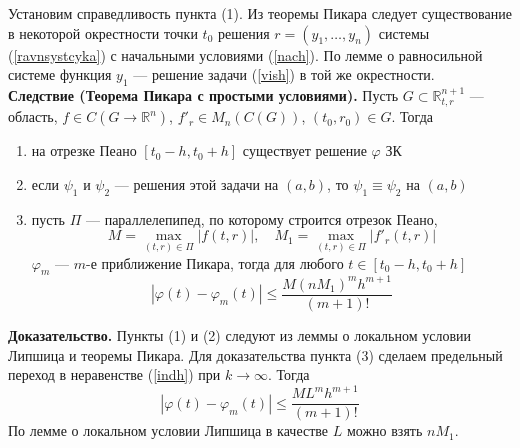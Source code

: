 Установим справедливость пункта (1). Из теоремы Пикара следует существование в некоторой окрестности точки $t_0$ решения $r = (y_1, \ldots, y_n)$ системы (\ref{ravnsystcyka}) с начальными условиями (\ref{nach}). По лемме о равносильной системе функция $y_1$ --- решение задачи (\ref{vish}) в той же окрестности.\\

\noindent \textbf{Следствие (Теорема Пикара с простыми условиями).} Пусть $G \subset \mathbb{R}_{t,r}^{n+1}$ --- область, $f \in C(G \to \mathbb{R}^n)$, $f'_r \in M_n(C(G))$, $(t_0, r_0) \in G$. Тогда
\begin{enumerate}
    \item на отрезке Пеано $[t_0 - h, t_0 + h]$ существует решение $\varphi$ ЗК
    \item если $\psi_1$ и $\psi_2$ --- решения этой задачи на $(a,b)$, то $\psi_1 \equiv \psi_2$ на $(a,b)$
    \item пусть $\Pi$ --- параллелепипед, по которому строится отрезок Пеано,
    \begin{equation*}
        M = \max_{(t,r) \in \Pi} |f(t,r)|, \quad M_1 = \max_{(t,r) \in \Pi} |f'_r(t,r)|
    \end{equation*}
    $\varphi_m$ --- $m$-е приближение Пикара, тогда для любого $t \in [t_0 - h, t_0 + h]$
    \begin{equation*}
        |\varphi(t) - \varphi_m(t)| \le \frac{M(nM_1)^mh^{m+1}}{(m+1)!}
    \end{equation*}
\end{enumerate}
\textbf{Доказательство.} Пункты (1) и (2) следуют из леммы о локальном условии Липшица и теоремы Пикара. Для доказательства пункта (3) сделаем предельный переход в неравенстве (\ref{indh}) при $k \to \infty$. Тогда
\begin{equation*}
    |\varphi(t) - \varphi_m(t)| \le \frac{ML^mh^{m+1}}{(m+1)!}
\end{equation*}
По лемме о локальном условии Липшица в качестве $L$ можно взять $nM_1$.

